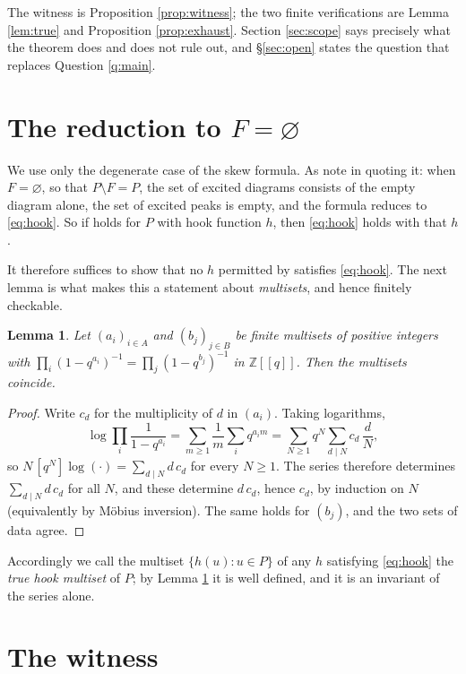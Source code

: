 \documentclass[reqno]{amsart}
\theoremstyle{plain}
\newtheorem{lemma}[theorem]{Lemma}
\theoremstyle{definition}
\begin{document}
The witness is Proposition \ref{prop:witness}; the two finite verifications
are Lemma \ref{lem:true} and Proposition \ref{prop:exhaust}.  Section
\ref{sec:scope} says precisely what the theorem does and does not rule out,
and \S\ref{sec:open} states the question that replaces Question \ref{q:main}.

\section{The reduction to \texorpdfstring{$F=\varnothing$}{F empty}}

We use only the degenerate case of the skew formula.  As
\cite[\S5.3]{DKK} note in quoting it: when $F=\varnothing$, so that
$P\setminus F=P$, the set of excited diagrams consists of the empty diagram
alone, the set of excited peaks is empty, and the formula reduces to
\eqref{eq:hook}.  So if \cite[Thm.~1.2]{NO} holds for $P$ with hook function
$h$, then \eqref{eq:hook} holds with that $h$.

It therefore suffices to show that no $h$ permitted by \cite[Def.~2.6]{NO}
satisfies \eqref{eq:hook}.  The next lemma is what makes this a statement about
\emph{multisets}, and hence finitely checkable.

\begin{lemma}\label{lem:unique}
Let $(a_i)_{i\in A}$ and $(b_j)_{j\in B}$ be finite multisets of positive
integers with
$\prod_{i}(1-q^{a_i})^{-1}=\prod_{j}(1-q^{b_j})^{-1}$ in
$\mathbb{Z}[[q]]$.  Then the multisets coincide.
\end{lemma}

\begin{proof}
Write $c_d$ for the multiplicity of $d$ in $(a_i)$.  Taking logarithms,
\[
  \log\prod_i\frac{1}{1-q^{a_i}}
  =\sum_{m\ge1}\frac1m\sum_i q^{a_im}
  =\sum_{N\ge1}q^N\sum_{d\mid N}c_d\,\frac{d}{N},
\]
so $N\,[q^N]\log(\cdot)=\sum_{d\mid N}d\,c_d$ for every $N\ge1$.  The series
therefore determines $\sum_{d\mid N}d\,c_d$ for all $N$, and these determine
$d\,c_d$, hence $c_d$, by induction on $N$ (equivalently by M\"obius
inversion).  The same holds for $(b_j)$, and the two sets of data agree.
\end{proof}

Accordingly we call the multiset $\{h(u):u\in P\}$ of any $h$ satisfying
\eqref{eq:hook} the \emph{true hook multiset} of $P$; by Lemma
\ref{lem:unique} it is well defined, and it is an invariant of the series
alone.

\section{The witness}
\end{document}
